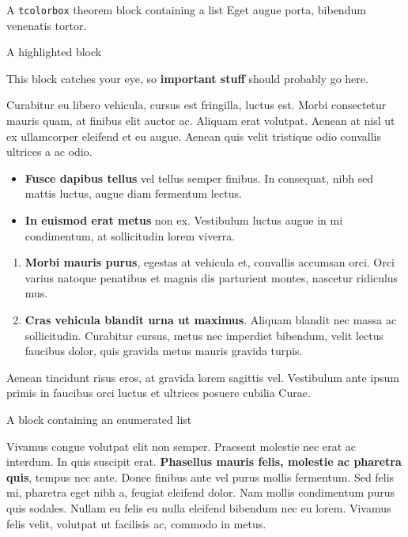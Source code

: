 \documentclass[final]{beamer}
\newlength{\colwidth}
\begin{document}
\begin{frame}[t]
\begin{columns}[t]
\begin{column}{\colwidth}
\begin{thm}{A \texttt{tcolorbox} theorem block containing a list}{}
				Eget augue porta, bibendum venenatis tortor.

			\end{thm}

			\begin{alertblock}{A highlighted block}

				This block catches your eye, so \textbf{important stuff} should probably go
				here.

				Curabitur eu libero vehicula, cursus est fringilla, luctus est. Morbi
				consectetur mauris quam, at finibus elit auctor ac. Aliquam erat volutpat.
				Aenean at nisl ut ex ullamcorper eleifend et eu augue. Aenean quis velit
				tristique odio convallis ultrices a ac odio.

				\begin{itemize}
					\item \textbf{Fusce dapibus tellus} vel tellus semper finibus. In
					      consequat, nibh sed mattis luctus, augue diam fermentum lectus.
					\item \textbf{In euismod erat metus} non ex. Vestibulum luctus augue in
					      mi condimentum, at sollicitudin lorem viverra.
				\end{itemize}

				\begin{enumerate}
					\item \textbf{Morbi mauris purus}, egestas at vehicula et, convallis
					      accumsan orci. Orci varius natoque penatibus et magnis dis parturient
					      montes, nascetur ridiculus mus.
					\item \textbf{Cras vehicula blandit urna ut maximus}. Aliquam blandit nec
					      massa ac sollicitudin. Curabitur cursus, metus nec imperdiet bibendum,
					      velit lectus faucibus dolor, quis gravida metus mauris gravida turpis.
				\end{enumerate}

				Aenean tincidunt risus eros, at gravida lorem sagittis vel. Vestibulum ante
				ipsum primis in faucibus orci luctus et ultrices posuere cubilia Curae.

			\end{alertblock}

			\begin{defbox}{A block containing an enumerated list}{}

				Vivamus congue volutpat elit non semper. Praesent molestie nec erat ac
				interdum. In quis suscipit erat. \textbf{Phasellus mauris felis, molestie
					ac pharetra quis}, tempus nec ante. Donec finibus ante vel purus mollis
				fermentum. Sed felis mi, pharetra eget nibh a, feugiat eleifend dolor. Nam
				mollis condimentum purus quis sodales. Nullam eu felis eu nulla eleifend
				bibendum nec eu lorem. Vivamus felis velit, volutpat ut facilisis ac,
				commodo in metus.


\end{defbox}
\end{column}
\end{columns}
\end{frame}
\end{document}
